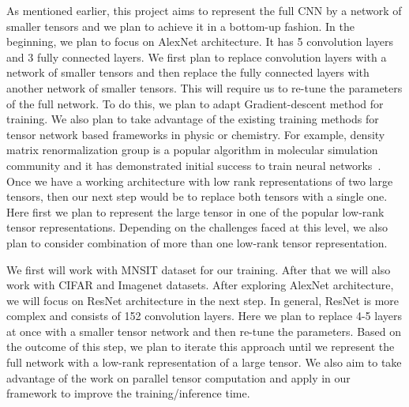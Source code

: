 As mentioned earlier, this project aims to represent the full CNN by a network of smaller tensors and we plan to achieve it in a bottom-up fashion. In the beginning, we plan to focus on AlexNet architecture. It has 5 convolution layers and 3 fully connected layers. We first plan to replace convolution layers with a network of smaller tensors and then replace the fully connected layers with another network of smaller tensors. This will require us to re-tune the parameters of the full network. To do this, we plan to adapt Gradient-descent method for training. We also plan to take advantage of the existing training methods for tensor network based frameworks in physic or chemistry. For example, density matrix renormalization group is a popular algorithm in molecular simulation community and it has demonstrated initial success to train neural networks~\cite{SS-NIPS2016}. Once we have a working architecture with low rank representations of two large tensors, then our next step would be to replace both tensors with a single one. Here first we plan to represent the large tensor in one of the popular low-rank tensor representations. Depending on the challenges faced at this level, we also plan to consider combination of more than one low-rank tensor representation.    


We first will work with  MNSIT dataset for our training. After that we will also work with CIFAR and Imagenet datasets. After exploring AlexNet architecture, we will focus on ResNet architecture in the next step. In general, ResNet is more complex and consists of 152 convolution layers. Here we plan to replace 4-5 layers at once with a smaller tensor network and then re-tune the parameters. Based on the outcome of this step, we plan to iterate this approach until we represent the full network with a low-rank representation of a large tensor. We also aim to take advantage of the  work on parallel tensor computation and apply in our framework to improve the training/inference time.


